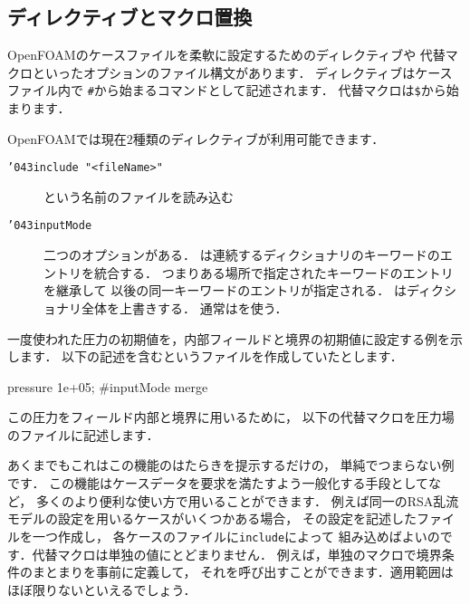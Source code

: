 \subsection{ディレクティブとマクロ置換}
\label{ssec:4.2.9}
OpenFOAMのケースファイルを柔軟に設定するためのディレクティブや
代替マクロといったオプションのファイル構文があります．
ディレクティブはケースファイル内で
\verb|#|から始まるコマンドとして記述されます．
代替マクロは\verb|$|から始まります．%

OpenFOAMでは現在$2$種類のディレクティブが利用可能できます．
\begin{description}
 \item[\texttt{\char'043include "<fileName>"}]
            という名前のファイルを読み込む
 \item[\texttt{\char'043inputMode}]
            二つのオプションがある．
            は連続するディクショナリのキーワードのエントリを統合する．
            つまりある場所で指定されたキーワードのエントリを継承して
            以後の同一キーワードのエントリが指定される．
            はディクショナリ全体を上書きする．
            通常はを使う．
\end{description}
一度使われた圧力の初期値を，内部フィールドと境界の初期値に設定する例を示します．
以下の記述を含むというファイルを作成していたとします．
\begin{OFverbatim}[file]
pressure 1e+05;
#inputMode merge
\end{OFverbatim}
この圧力をフィールド内部と境界に用いるために，
以下の代替マクロを圧力場のファイルに記述します．
あくまでもこれはこの機能のはたらきを提示するだけの，
単純でつまらない例です．
この機能はケースデータを要求を満たすよう一般化する手段としてなど，
多くのより便利な使い方で用いることができます．
例えば同一のRSA乱流モデルの設定を用いるケースがいくつかある場合，
その設定を記述したファイルを一つ作成し，
各ケースのファイルに\texttt{include}によって
組み込めばよいのです．代替マクロは単独の値にとどまりません．
例えば，単独のマクロで境界条件のまとまりを事前に定義して，
それを呼び出すことができます．適用範囲はほぼ限りないといえるでしょう．



